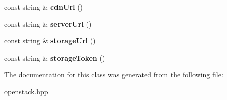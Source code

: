 \begin{DoxyCompactItemize}
\item 
\hypertarget{classopenstack_1_1Openstack_ac9bb9d4d91db4a3008fa17d892c0beaa}{
const string \& {\bfseries cdnUrl} ()}
\label{classopenstack_1_1Openstack_ac9bb9d4d91db4a3008fa17d892c0beaa}

\item 
\hypertarget{classopenstack_1_1Openstack_afd029400dff8dcb8a8f845443447aeba}{
const string \& {\bfseries serverUrl} ()}
\label{classopenstack_1_1Openstack_afd029400dff8dcb8a8f845443447aeba}

\item 
\hypertarget{classopenstack_1_1Openstack_a95cf88fc9e748e3a34e14930eee58e34}{
const string \& {\bfseries storageUrl} ()}
\label{classopenstack_1_1Openstack_a95cf88fc9e748e3a34e14930eee58e34}

\item 
\hypertarget{classopenstack_1_1Openstack_a2330f6329012d2d59f948f478d05eb0c}{
const string \& {\bfseries storageToken} ()}
\label{classopenstack_1_1Openstack_a2330f6329012d2d59f948f478d05eb0c}

\end{DoxyCompactItemize}


The documentation for this class was generated from the following file:\begin{DoxyCompactItemize}
\item 
openstack.hpp\end{DoxyCompactItemize}
